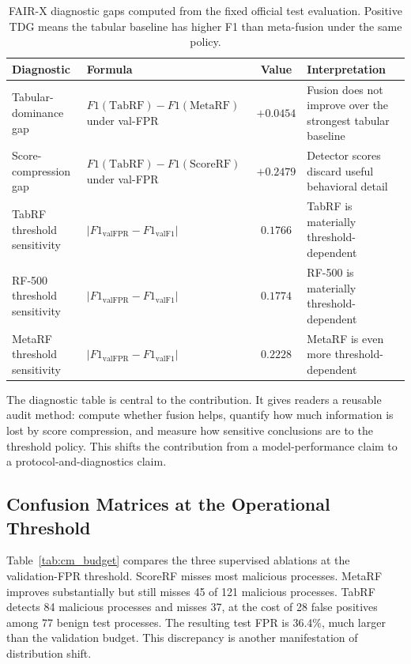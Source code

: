 \documentclass[10pt,journal,compsoc]{IEEEtran}
\begin{document}
\begin{table}[t]
\centering
\caption{FAIR-X diagnostic gaps computed from the fixed official test evaluation. Positive TDG means the tabular baseline has higher F1 than meta-fusion under the same policy.}
\label{tab:diagnostics}
\small
\begin{tabular}{p{3.2cm}p{5.0cm}cp{5.2cm}}
\toprule
\textbf{Diagnostic} & \textbf{Formula} & \textbf{Value} & \textbf{Interpretation} \\
\midrule
Tabular-dominance gap & $F1(\mathrm{TabRF})-F1(\mathrm{MetaRF})$ under val-FPR & $+0.0454$ & Fusion does not improve over the strongest tabular baseline \\
Score-compression gap & $F1(\mathrm{TabRF})-F1(\mathrm{ScoreRF})$ under val-FPR & $+0.2479$ & Detector scores discard useful behavioral detail \\
TabRF threshold sensitivity & $|F1_{\mathrm{valFPR}}-F1_{\mathrm{valF1}}|$ & $0.1766$ & TabRF is materially threshold-dependent \\
RF-500 threshold sensitivity & $|F1_{\mathrm{valFPR}}-F1_{\mathrm{valF1}}|$ & $0.1774$ & RF-500 is materially threshold-dependent \\
MetaRF threshold sensitivity & $|F1_{\mathrm{valFPR}}-F1_{\mathrm{valF1}}|$ & $0.2228$ & MetaRF is even more threshold-dependent \\
\bottomrule
\end{tabular}
\end{table}

The diagnostic table is central to the contribution. It gives readers a reusable audit method: compute whether fusion helps, quantify how much information is lost by score compression, and measure how sensitive conclusions are to the threshold policy. This shifts the contribution from a model-performance claim to a protocol-and-diagnostics claim.

\subsection{Confusion Matrices at the Operational Threshold}

Table~\ref{tab:cm_budget} compares the three supervised ablations at the validation-FPR threshold. ScoreRF misses most malicious processes. MetaRF improves substantially but still misses 45 of 121 malicious processes. TabRF detects 84 malicious processes and misses 37, at the cost of 28 false positives among 77 benign test processes. The resulting test FPR is 36.4\%, much larger than the validation budget. This discrepancy is another manifestation of distribution shift.
\end{document}
